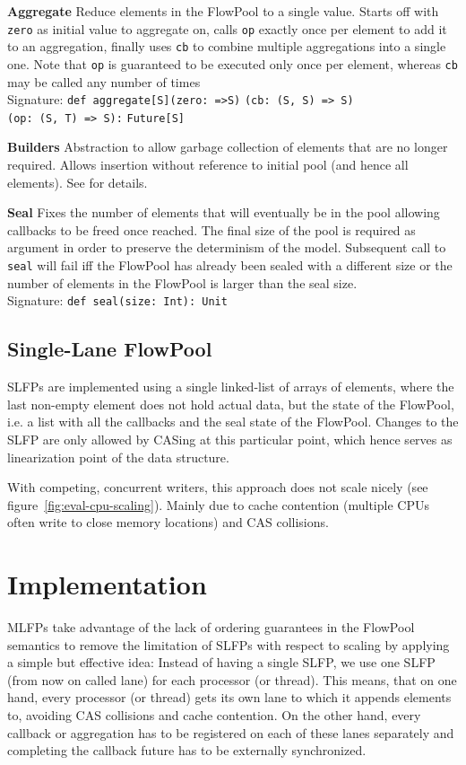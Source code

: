 \documentclass[runningheads,a4paper,fleqn]{llncs}
\begin{document}
\textbf{Aggregate} Reduce elements in the FlowPool to a single
value. Starts off with \verb+zero+ as initial value to aggregate on,
calls \verb+op+ exactly once per element to add it to an aggregation,
finally uses \verb+cb+ to combine multiple aggregations into a single
one. Note that \verb+op+ is guaranteed to be executed only once per
element, whereas \verb+cb+ may be called any number of times\\
Signature: \verb+def aggregate[S]+\verb+(zero: =>S)+
\verb+(cb: (S, S) => S)+\\
\verb+(op: (S, T) => S):+ \verb+Future[S]+

\textbf{Builders} Abstraction to allow garbage collection of elements
that are no longer required. Allows insertion without reference to
initial pool (and hence all elements). See \cite{FP12} for details.

\textbf{Seal} Fixes the number of elements that will eventually be in
the pool allowing callbacks to be freed once reached. The final size
of the pool is required as argument in order to preserve the
determinism of the model. Subsequent call to \verb+seal+ will fail iff
the FlowPool has already been sealed with a different size or the
number of elements in the FlowPool is larger than the seal size.\\
Signature: \verb+def seal(size: Int): Unit+

\subsection{Single-Lane FlowPool}
SLFPs are implemented using a single linked-list of arrays of
elements, where the last non-empty element does not hold actual data,
but the state of the FlowPool, i.e. a list with all the callbacks and
the seal state of the FlowPool. Changes to the SLFP are only allowed
by CASing at this particular point, which hence serves as
linearization point of the data structure.

With competing, concurrent writers, this approach does not scale
nicely (see figure~\ref{fig:eval-cpu-scaling}). Mainly due to cache
contention (multiple CPUs often write to close memory locations) and
CAS collisions.

\section{Implementation}
MLFPs take advantage of the lack of ordering guarantees in the
FlowPool semantics to remove the limitation of SLFPs with respect to
scaling by applying a simple but effective idea: Instead of having a
single SLFP, we use one SLFP (from now on called lane) for each
processor (or thread). This means, that on one hand, every processor
(or thread) gets its own lane to which it appends elements to,
avoiding CAS collisions and cache contention. On the other hand, every
callback or aggregation has to be registered on each of these lanes
separately and completing the callback future has to be externally
synchronized.
\end{document}
